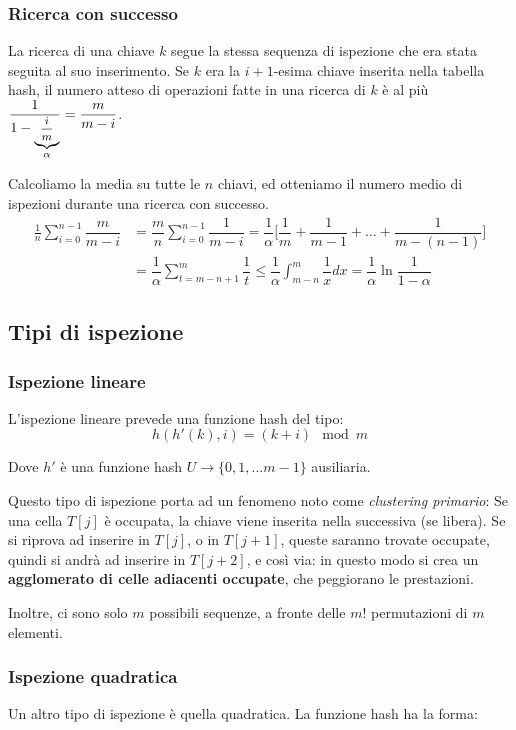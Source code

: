 \documentclass[a4paper,10pt]{article}
\theoremstyle{definition}
\begin{document}
\subsubsection{Ricerca con successo}
La ricerca di una chiave $k$ segue la stessa sequenza di ispezione che era stata seguita al suo inserimento. Se $k$ era la $i+1$-esima chiave inserita nella tabella hash, il numero atteso di operazioni fatte in una ricerca di $k$ è al più $\dfrac{1}{1-\underbrace{\text{\footnotesize$\frac{i}{m}$}}_{\alpha}} = \dfrac{m}{m-i}$.

Calcoliamo la media su tutte le $n$ chiavi, ed otteniamo il numero medio di ispezioni durante una ricerca con successo.
\[\begin{aligned}
\frac{1}{n}\sum_{i= 0}^{n-1} \dfrac{m}{m-i} &= \dfrac{m}{n}\sum_{i= 0}^{n-1} \dfrac{1}{m-i} = \dfrac{1}{\alpha} \bigg[\dfrac{1}{m} + \dfrac{1}{m-1}+\hdots+\dfrac{1}{m-(n-1)}\bigg]\\
&= \dfrac{1}{\alpha} \sum_{t = m-n+1}^m \dfrac{1}{t} \leq \dfrac{1}{\alpha} \int_{m-n}^{m} \dfrac{1}{x}dx = \dfrac{1}{\alpha} \ln \dfrac{1}{1-\alpha}
\end{aligned}
\]
\newpage

\subsection{Tipi di ispezione}
\subsubsection{Ispezione lineare}
L'ispezione lineare prevede una funzione hash del tipo:
\[h(h'(k), i) = (k+i)\mod m\]

Dove $h'$ è una funzione hash $U \to \{0,1,\hdots m-1\}$ ausiliaria.\bigskip


Questo tipo di ispezione porta ad un fenomeno noto come \emph{clustering primario}: Se una cella $T[j]$ è occupata, la chiave viene inserita nella successiva (se libera). Se si riprova ad inserire in $T[j]$, o in $T[j+1]$, queste saranno trovate occupate, quindi si andrà ad inserire in $T[j+2]$, e così via: in questo modo si crea un \textbf{agglomerato di celle adiacenti occupate}, che peggiorano le prestazioni.\bigskip

Inoltre, ci sono solo $m$ possibili sequenze, a fronte delle $m!$ permutazioni di $m$ elementi.

\subsubsection{Ispezione quadratica}
Un altro tipo di ispezione è quella quadratica. La funzione hash ha la forma:
\end{document}
